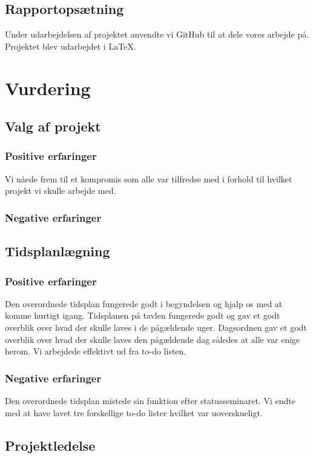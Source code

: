 \subsection{Rapportopsætning}
Under udarbejdelsen af projektet anvendte vi GitHub til at dele vores arbejde på. Projektet blev udarbejdet i LaTeX. 

\section{Vurdering}

\subsection{Valg af projekt}

\subsubsection{Positive erfaringer}
Vi nåede frem til et kompromis som alle var tilfredse med i forhold til hvilket projekt vi skulle arbejde med.
\subsubsection{Negative erfaringer}

\subsection{Tidsplanlægning}

\subsubsection{Positive erfaringer}
Den overordnede tidsplan fungerede godt i begyndelsen og hjalp os med at komme hurtigt igang. Tidsplanen på tavlen fungerede godt og gav et godt overblik over hvad der skulle laves i de pågældende uger. Dagsordnen gav et godt overblik over hvad der skulle laves den pågældende dag således at alle var enige herom. Vi arbejdede effektivt ud fra to-do listen. 

\subsubsection{Negative erfaringer}
Den overordnede tidsplan mistede sin funktion efter statusseminaret. Vi endte med at have lavet tre forskellige to-do lister hvilket var uoverskueligt.

\subsection{Projektledelse}

